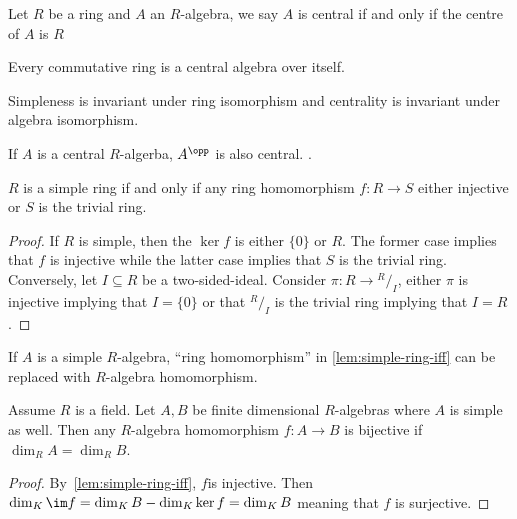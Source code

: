 \begin{definition}
  Let $R$ be a ring and $A$ an $R$-algebra, we say $A$ is central if and only if
  the centre of $A$ is $R$
  \leanok
\end{definition}

\begin{remark}
  Every commutative ring is a central algebra over itself.
\end{remark}

\begin{remark}
  Simpleness is invariant under ring isomorphism and centrality is invariant
  under algebra isomorphism.
\end{remark}

\begin{lemma}
  \label{lem:opp-central}
  If $A$ is a central $R$-algerba, $A^{\opp}$ is also central.
  \leanok
  .
\end{lemma}

\begin{lemma}\label{lem:simple-ring-iff}
  $R$ is a simple ring if and only if any ring homomorphism $f : R \to S$ either
  injective or $S$ is the trivial ring. \leanok
\end{lemma}
\begin{proof}
  If $R$ is simple, then the $\ker f$ is either $\{0\}$ or $R$. The former case
  implies that $f$ is injective while the latter case implies that $S$ is the
  trivial ring. Conversely, let $I\subseteq R$ be a two-sided-ideal. Consider
  $\pi: R \to {}^{R}/_{I}$, either $\pi$ is injective implying that $I = \{0\}$
  or that ${}^{R}/_{I}$ is the trivial ring implying that $I = R$.
\end{proof}
\begin{remark}
  If $A$ is a simple $R$-algebra, ``ring homomorphism'' in \cref{lem:simple-ring-iff} can be replaced with $R$-algebra homomorphism.
\end{remark}

\begin{corollary}\label{cor:alghom-bijective-of-dim-eq}
  Assume $R$ is a field. Let $A, B$ be finite dimensional $R$-algebras where $A$
  is simple as well. Then any $R$-algebra homomorphism $f:A\to B$ is bijective
  if $\dim_{R}A=\dim_{R}B$. 
  \leanok
\end{corollary}
\begin{proof}
  By~\cref{lem:simple-ring-iff}, $f$is injective. Then
  $\dim_{K}\im f = \dim_{K} B - \dim_{K}\ker f = \dim_{K}B$ meaning that $f$ is
  surjective.
\end{proof}

